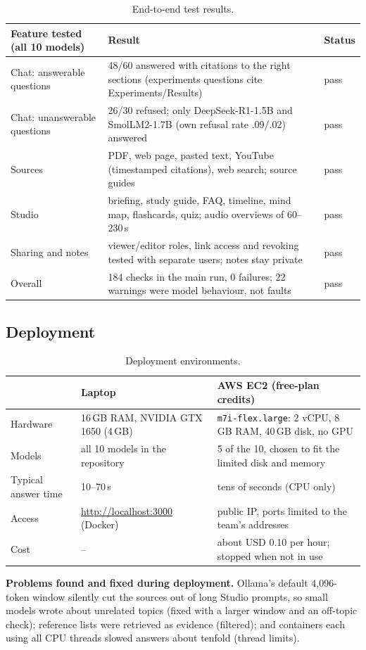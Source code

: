 \documentclass[10pt]{article}
\begin{document}
\begin{table}[H]
\centering\small
\begin{tabularx}{\textwidth}{@{}lYl@{}}
\toprule
Feature tested (all 10 models) & Result & Status \\
\midrule
Chat: answerable questions & 48/60 answered with citations to the right sections (experiments questions cite Experiments/Results) & pass \\
Chat: unanswerable questions & 26/30 refused; only DeepSeek-R1-1.5B and SmolLM2-1.7B (own refusal rate .09/.02) answered & pass \\
Sources & PDF, web page, pasted text, YouTube (timestamped citations), web search; source guides & pass \\
Studio & briefing, study guide, FAQ, timeline, mind map, flashcards, quiz; audio overviews of 60--230\,s & pass \\
Sharing and notes & viewer/editor roles, link access and revoking tested with separate users; notes stay private & pass \\
Overall & 184 checks in the main run, 0 failures; 22 warnings were model behaviour, not faults & pass \\
\bottomrule
\end{tabularx}
\caption{End-to-end test results.}
\label{tab:e2e}
\end{table}
\vspace{-6pt}

\subsection{Deployment}
\begin{table}[H]
\centering\small
\begin{tabularx}{\textwidth}{@{}lYY@{}}
\toprule
 & Laptop & AWS EC2 (free-plan credits) \\
\midrule
Hardware & 16\,GB RAM, NVIDIA GTX 1650 (4\,GB) & \texttt{m7i-flex.large}: 2 vCPU, 8\,GB RAM, 40\,GB disk, no GPU \\
Models & all 10 models in the repository & 5 of the 10, chosen to fit the limited disk and memory \\
Typical answer time & 10--70\,s & tens of seconds (CPU only) \\
Access & \url{http://localhost:3000} (Docker) & public IP, ports limited to the team's addresses \\
Cost & -- & about USD 0.10 per hour; stopped when not in use \\
\bottomrule
\end{tabularx}
\caption{Deployment environments.}
\end{table}
\vspace{-6pt}
\textbf{Problems found and fixed during deployment.} Ollama's default 4{,}096-token window silently cut the sources out of long Studio prompts, so small models wrote about unrelated topics (fixed with a larger window and an off-topic check); reference lists were retrieved as evidence (filtered); and containers each using all CPU threads slowed answers about tenfold (thread limits).
\end{document}

